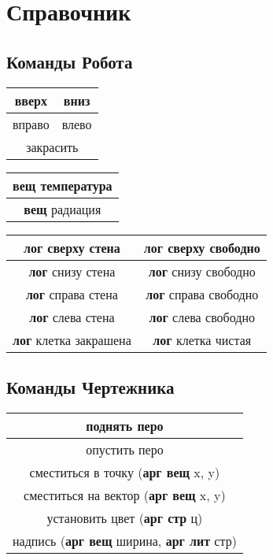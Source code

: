 \chapter{Справочник}

\section{Команды Робота}

\begin{center}
\begin{tabular}{||c|c||}
\hline
\hline
вверх &  вниз\\
\hline
вправо &  влево\\
\hline
\multicolumn{2}{||c||}{закрасить}\\
\hline
\hline
\end{tabular}
\begin{tabular}{||c||}
\hline
\hline
\textbf{вещ} температура\\
\hline
\textbf{вещ} радиация\\
\hline
\hline
\end{tabular}

\vspace{1ex}

\begin{tabular}{||c|c||}
\hline
\hline
\textbf{лог} сверху стена & \textbf{лог} сверху свободно\\
\hline
\textbf{лог} снизу стена & \textbf{лог} снизу свободно\\
\hline
\textbf{лог} справа стена & \textbf{лог} справа свободно\\
\hline
\textbf{лог} слева стена & \textbf{лог} слева свободно\\
\hline
\textbf{лог} клетка закрашена & \textbf{лог} клетка чистая\\
\hline
\hline
\end{tabular}
\end{center}

\section{Команды Чертежника}
\begin{center}
\begin{tabular}{||c||}
\hline
\hline
поднять перо\\
\hline
  опустить перо\\
\hline
  сместиться в точку (\textbf{арг вещ} x, y)\\
\hline
  сместиться на вектор (\textbf{арг вещ} x, y)\\
\hline
  установить цвет (\textbf{арг стр} ц)\\
\hline
  надпись (\textbf{арг вещ} ширина, \textbf{арг лит} стр)\\
\hline
\hline
\end{tabular}
\end{center}

